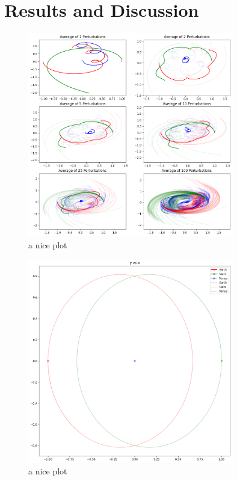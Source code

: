 \documentclass{article}
\begin{document}
\section{Results and Discussion}
\begin{figure}[h!]
    \centering
    \includegraphics[width=0.8\textwidth]{Images/averages1to100.png}
    \caption{a nice plot}
    \label{fig:mesh1}
\end{figure}

\begin{figure}[h!]
    \centering
    \includegraphics[width=0.8\textwidth]{Images/noPerterbations.png}
    \caption{a nice plot}
    \label{fig:mesh2}
\end{figure}
\end{document}

